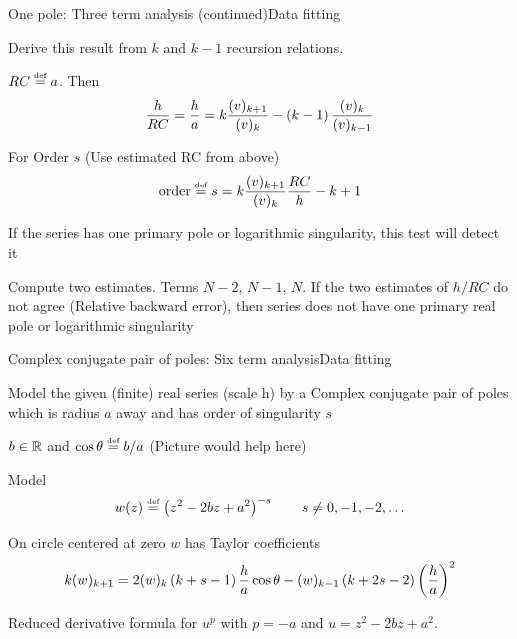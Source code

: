 \documentclass[11pt,svgnames,fleqn]{beamer}
\newcommand{\NC}[1]{{\color{red}#1}}
\newcommand{\DM}[1]{\begin{displaymath} {#1} \end{displaymath}}
\begin{document}
\begin{frame}{One pole: Three term analysis (continued)}{Data fitting}

  Derive this result from $k$ and $k-1$ recursion relations.

\vspace{2mm}

$RC \stackrel{\textup{\tiny def}}{=} a$. Then
\DM
{
  \frac{h}{RC} = \frac{h}{a} = k \frac{\tc{v}{k+1}}{\tc{v}{k}} - \parbg{k-1} \frac{\tc{v}{k}}{\tc{v}{k-1}}
}
  
  For Order $s$ (Use estimated RC from above)
\DM
{
  \text{order} \defeq s = k \frac{\tc{v}{k+1}}{\tc{v}{k}}\frac{RC}{h} - k + 1
}

  \NC{If the series has one primary pole or logarithmic singularity, this test will detect it}

  \vspace{2mm}

  Compute two estimates. Terms $N-2$, $N-1$, $N$.
  If the two estimates of $h/RC$ do not agree (Relative backward error), then series does not have
  one primary real pole or logarithmic singularity
\end{frame}

\begin{frame}{Complex conjugate pair of poles: Six term analysis}{Data fitting}

  Model the given (finite) real series (scale h) by a Complex conjugate pair of poles
  which is radius $a$ away and has order of singularity $s$

  \vspace{2mm}

  $b \in \mathbb{R}$ and $\cos \theta \stackrel{\textup{\tiny def}}{=} b/a$ (Picture would help here)

  \vspace{2mm}

  Model
  \DM
  {
    w(z) \defeq \parbg{z^2 - 2 b z + a^2}^{-s} \qquad s \neq 0, -1, -2, \ldots
  }

  \vspace{2mm}

  On circle centered at zero $w$ has Taylor coefficients 
  \DM
  {
    k \tc{w}{k+1} = 2 \tc{w}{k}\parbg{k+s-1}\frac{h}{a} \cos \theta 
    - \tc{w}{k-1}\parbg{k+2s-2}\parbg{\frac{h}{a}}^2
  }
 
  Reduced derivative formula for $u^p$ with $p=-a$ and $u=z^2 - 2 b z + a^2$.
\end{frame}
\end{document}
